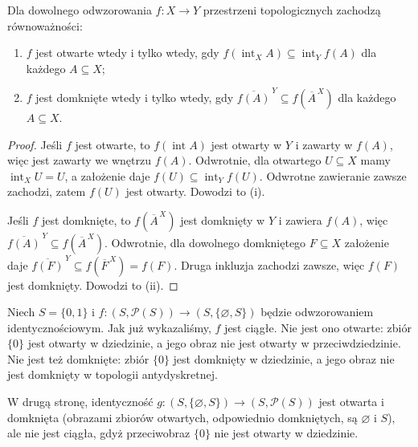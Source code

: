 \begin{stwierdzenie}
\label{prop:topog-otwarte-domkniete-kryteria}
Dla dowolnego odwzorowania $f\colon X\to Y$
przestrzeni topologicznych zachodzą równoważności:
\begin{enumerate}[label=(\roman*)]
\item $f$ jest otwarte wtedy i tylko wtedy, gdy
      $f(\operatorname{int}_X A)
        \subseteq\operatorname{int}_Y f(A)$
      dla każdego $A\subseteq X$;
\item $f$ jest domknięte wtedy i tylko wtedy, gdy
      $\overline{f(A)}^{\,Y}\subseteq f(\overline A^{\,X})$
      dla każdego $A\subseteq X$.
\end{enumerate}
\end{stwierdzenie}
\begin{proof}
Jeśli $f$ jest otwarte, to $f(\operatorname{int}A)$
jest otwarty w $Y$ i zawarty w $f(A)$, więc
jest zawarty we wnętrzu $f(A)$. Odwrotnie,
dla otwartego $U\subseteq X$ mamy
$\operatorname{int}_X U=U$, a założenie daje
$f(U)\subseteq\operatorname{int}_Y f(U)$.
Odwrotne zawieranie zawsze zachodzi, zatem
$f(U)$ jest otwarty. Dowodzi to (i).

Jeśli $f$ jest domknięte, to $f(\overline A^{\,X})$
jest domknięty w $Y$ i zawiera $f(A)$, więc
$\overline{f(A)}^{\,Y}\subseteq f(\overline A^{\,X})$.
Odwrotnie, dla dowolnego domkniętego $F\subseteq X$
założenie daje
$\overline{f(F)}^{\,Y}\subseteq f(\overline F^{\,X})=f(F)$.
Druga inkluzja zachodzi zawsze, więc $f(F)$ jest
domknięty. Dowodzi to (ii).
\end{proof}

\begin{przyklad}
\label{ex:topog-ciaglosc-a-otwartosc-domknietosc}
Niech $S=\{0,1\}$ i
$f\colon(S,\mathcal P(S))\to(S,\{\varnothing,S\})$
będzie odwzorowaniem identycznościowym.
Jak już wykazaliśmy, $f$ jest ciągłe. Nie jest ono
otwarte: zbiór $\{0\}$ jest otwarty w dziedzinie,
a jego obraz nie jest otwarty w przeciwdziedzinie.
Nie jest też domknięte: zbiór $\{0\}$ jest domknięty
w dziedzinie, a jego obraz nie jest domknięty
w topologii antydyskretnej.

W drugą stronę, identyczność
$g\colon(S,\{\varnothing,S\})\to(S,\mathcal P(S))$
jest otwarta i domknięta (obrazami zbiorów otwartych,
odpowiednio domkniętych, są $\varnothing$ i $S$),
ale nie jest ciągła, gdyż przeciwobraz $\{0\}$ nie
jest otwarty w dziedzinie.
\end{przyklad}

